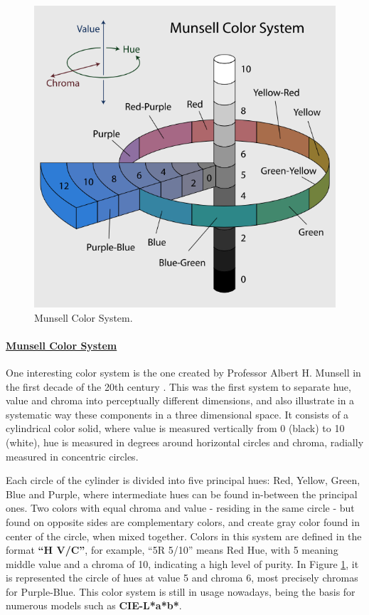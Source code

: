 \documentclass{report}
\begin{document}
\begin{figure}
  \centering
  \vspace{-\baselineskip}
  \includegraphics[width=0.9\linewidth]{MunsellSystem.png}
  \caption[Munsell Color System Representation]{Munsell Color System.\protect\footnotemark{}}	
  \label{fig:munsell}
\end{figure}
%
\paragraph{\underline{Munsell Color System}} One interesting color system is the one created by
Professor Albert H. Munsell in the first decade of the 20th century \cite{Munsell1919}. This was the first system to separate
hue, value and chroma into perceptually different dimensions, and also illustrate in a systematic way these
components in a three dimensional space. It consists of a cylindrical color solid, where value is measured
vertically from 0 (black) to 10 (white), hue is measured in degrees around horizontal circles and chroma,
radially measured in concentric circles. \par 
Each circle of the cylinder is divided into five principal hues: Red, Yellow, Green, Blue and Purple, where
intermediate hues can be found
in-between the principal ones. Two colors with equal chroma and value - residing in the same circle - but
found on opposite sides are complementary colors, and create gray color found in center of the
circle, when mixed together.  Colors in this system are defined in the format \textbf{“H V/C”}, for example,
“5R 5/10” means Red Hue, with 5 meaning middle value and a chroma of 10, indicating a high level of purity. In Figure \ref{fig:munsell}, it is represented the circle of hues at value 5 and chroma 6, most precisely chromas for Purple-Blue.
This color system is still in usage nowadays, being the basis for numerous models such as \textbf{CIE-L*a*b*}. \par
%
\end{document}

